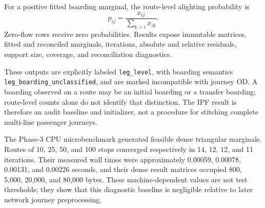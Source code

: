For a positive fitted boarding marginal, the route-level alighting probability
is
\[
p_{ij}=\frac{x_{ij}}{\sum_{k>i}x_{ik}}.
\]
Zero-flow rows receive zero probabilities.  Results expose immutable matrices,
fitted and reconciled marginals, iterations, absolute and relative residuals,
support size, coverage, and reconciliation diagnostics.

These outputs are explicitly labeled \texttt{leg\_level}, with boarding
semantics \texttt{leg\_boarding\_\allowbreak unclassified}, and are marked incompatible
with journey OD.  A boarding observed on a route may be an initial boarding or
a transfer boarding; route-level counts alone do not identify that distinction.
The IPF result is therefore an audit baseline and initializer, not a procedure
for stitching complete multi-line passenger journeys.

The Phase-3 CPU microbenchmark generated feasible dense triangular marginals.
Routes of 10, 25, 50, and 100 stops converged respectively in 14, 12, 12, and
11 iterations.  Their measured wall times were approximately 0.00059,
0.00078, 0.00131, and 0.00226 seconds, and their dense result matrices occupied
800, 5,000, 20,000, and 80,000 bytes.  These machine-dependent values are not
test thresholds; they show that this diagnostic baseline is negligible
relative to later network journey preprocessing.

